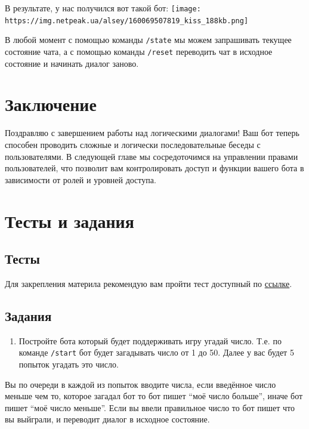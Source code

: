\documentclass[
]{book}
\providecommand{\tightlist}{%
  \setlength{\itemsep}{0pt}\setlength{\parskip}{0pt}}
\begin{document}
В результате, у нас получился вот такой бот:
\texttt{[image: https://img.netpeak.ua/alsey/160069507819\_kiss\_188kb.png]}

В любой момент с помощью команды \texttt{/state} мы можем запрашивать текущее состояние чата, а с помощью команды \texttt{/reset} переводить чат в исходное состояние и начинать диалог заново.

\section{Заключение}\label{ux437ux430ux43aux43bux44eux447ux435ux43dux438ux435-3}

Поздравляю с завершением работы над логическими диалогами! Ваш бот теперь способен проводить сложные и логически последовательные беседы с пользователями. В следующей главе мы сосредоточимся на управлении правами пользователей, что позволит вам контролировать доступ и функции вашего бота в зависимости от ролей и уровней доступа.

\section{Тесты и задания}\label{ux442ux435ux441ux442ux44b-ux438-ux437ux430ux434ux430ux43dux438ux44f-3}

\subsection{Тесты}\label{ux442ux435ux441ux442ux44b-3}

Для закрепления материла рекомендую вам пройти тест доступный по \href{https://onlinetestpad.com/t/build-tg-bot-in-r-4}{ссылке}.

\subsection{Задания}\label{ux437ux430ux434ux430ux43dux438ux44f-3}

\begin{enumerate}
\def\labelenumi{\arabic{enumi}.}
\tightlist
\item
  Постройте бота который будет поддерживать игру угадай число. Т.е. по команде \texttt{/start} бот будет загадывать число от 1 до 50. Далее у вас будет 5 попыток угадать это число.
\end{enumerate}

Вы по очереди в каждой из попыток вводите числа, если введённое число меньше чем то, которое загадал бот то бот пишет ``моё число больше'', иначе бот пишет ``моё число меньше''. Если вы ввели правильное число то бот пишет что вы выйграли, и переводит диалог в исходное состояние.
\end{document}
